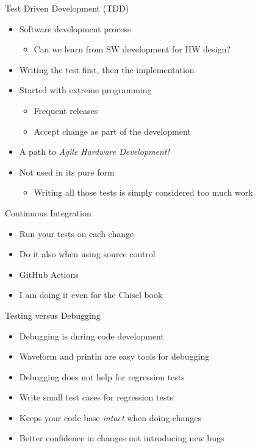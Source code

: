 \begin{frame}[fragile]{Test Driven Development (TDD)}
\begin{itemize}
\item Software development process
\begin{itemize}
\item Can we learn from SW development for HW design?
\end{itemize}
\item Writing the test first, then the implementation
\item Started with extreme programming
\begin{itemize}
\item Frequent releases
\item Accept change as part of the development
\end{itemize}
\item A path to \emph{Agile Hardware Development!}
\item Not used in its pure form
\begin{itemize}
\item Writing all those tests is simply considered too much work
\end{itemize}
\end{itemize}
\end{frame}

\begin{frame}[fragile]{Continuous Integration}
\begin{itemize}
\item Run your tests on each change
\item Do it also when using source control
\item GitHub Actions
\item I am doing it even for the Chisel book
\end{itemize}
\end{frame}

\begin{frame}[fragile]{Testing versus Debugging}
\begin{itemize}
\item Debugging is during code development
\item Waveform and println are easy tools for debugging
\item Debugging does not help for regression tests
\item Write small test cases for regression tests
\item Keeps your code base \emph{intact} when doing changes
\item Better confidence in changes not introducing new bugs
\end{itemize}
\end{frame}

